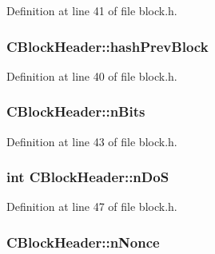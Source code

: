 Definition at line 41 of file block.\+h.

\hypertarget{class_c_block_header_ad9b904df502d648309342e5e5b0949a6}{}
\subsubsection[{hash\+Prev\+Block}]{ C\+Block\+Header\+::hash\+Prev\+Block}\label{class_c_block_header_ad9b904df502d648309342e5e5b0949a6}


Definition at line 40 of file block.\+h.

\hypertarget{class_c_block_header_a88d501b1da4d34d7dc80c65bd4837670}{}
\subsubsection[{n\+Bits}]{ C\+Block\+Header\+::n\+Bits}\label{class_c_block_header_a88d501b1da4d34d7dc80c65bd4837670}


Definition at line 43 of file block.\+h.

\hypertarget{class_c_block_header_af07deb221708fa7a992e65ec20d13534}{}
\subsubsection[{n\+Do\+S}]{\setlength{\rightskip}{0pt plus 5cm}int C\+Block\+Header\+::n\+Do\+S\hspace{0.3cm}{\ttfamily [mutable]}}\label{class_c_block_header_af07deb221708fa7a992e65ec20d13534}


Definition at line 47 of file block.\+h.

\hypertarget{class_c_block_header_a3826d43cd36673027e17ecc674450e71}{}
\subsubsection[{n\+Nonce}]{ C\+Block\+Header\+::n\+Nonce}\label{class_c_block_header_a3826d43cd36673027e17ecc674450e71}


